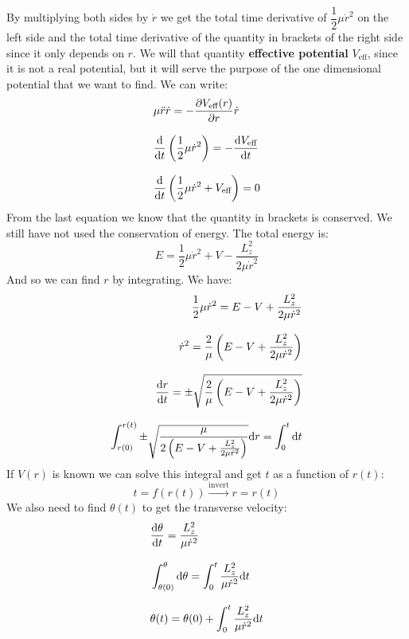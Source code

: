 By multiplying both sides by $\dot{r}$ we get the total time derivative of $\dfrac{1}{2}\mu \dot{r}^2$ on the left side and the total time derivative of the quantity in brackets of the right side since it only depends on $r$. We will that quantity \textbf{effective potential} $V_{\text{eff}}$, since it is not a real potential, but it will serve the purpose of the one dimensional potential that we want to find. We can write:
\begin{equation}
    \begin{split}
        &\mu \ddot{r}\dot{r} = -\pdv{V_{\text{eff}}(r)}{r}\dot{r} \\[8pt]
        &\dv{}{t}\brackets{\dfrac{1}{2}\mu \dot{r}^2} = -\dv{V_{\text{eff}}}{t} \\[8pt]
        &\dv{}{t}\brackets{\dfrac{1}{2}\mu \dot{r}^2 + V_{\text{eff}}} = 0
    \end{split}
\end{equation}
From the last equation we know that the quantity in brackets is conserved. We still have not used the conservation of energy. The total energy is:
\begin{equation}
    E = \dfrac{1}{2}\mu \dot{r}^2 + V - \dfrac{L_z^2}{2\mu \dot{r}^2}
\end{equation}
And so we can find $r$ by integrating. We have:
\begin{equation}
    \begin{split}
        \dfrac{1}{2}\mu \dot{r}^2 = E - V + \dfrac{L_z^2}{2\mu \dot{r}^2} \\[8pt]
        \dot{r}^2 = \dfrac{2}{\mu}\brackets{E - V + \dfrac{L_z^2}{2\mu \dot{r}^2}} \\[8pt]
        \dv{r}{t} = \pm\sqrt{\dfrac{2}{\mu}\brackets{E - V + \dfrac{L_z^2}{2\mu \dot{r}^2}}} \\[8pt]
        \int_{r(0)}^{r(t)}\pm\sqrt{\dfrac{\mu}{2\brackets{E - V + \frac{L_z^2}{2\mu \dot{r}^2}}}}\diff{r} = \int_{0}^{t}\diff{t}
    \end{split}
\end{equation}
If $V(r)$ is known we can solve this integral and get $t$ as a function of $r(t)$:
\begin{equation}
  t = f(r(t)) \xrightarrow{\text{invert}} r = r(t)
\end{equation}
We also need to find $\theta(t)$ to get the transverse velocity:
\begin{equation}
  \begin{split}
    &\dv{\theta}{t} = \dfrac{L_z^2}{\mu \dot{r}^2} \\[8pt]
    &\int_{\theta(0)}^{\theta}\diff{\theta} = \int_{0}^{t}\dfrac{L_z^2}{\mu \dot{r}^2}\diff{t} \\[8pt]
    &\theta(t) = \theta(0) + \int_{0}^{t}\dfrac{L_z^2}{\mu \dot{r}^2}\diff{t}
  \end{split}
\end{equation}
